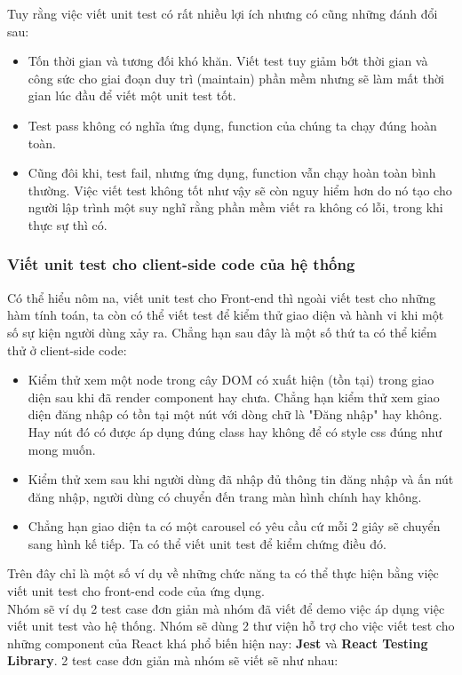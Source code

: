 			 	Tuy rằng việc viết unit test có rất nhiều lợi ích nhưng có cũng những đánh đổi sau:
			 	\begin{itemize}
			 		\item Tốn thời gian và tương đối khó khăn. Viết test tuy giảm bớt thời gian và công sức cho giai đoạn duy trì (maintain) phần mềm nhưng sẽ làm mất thời gian lúc đầu để viết một unit test tốt.
			 		\item Test pass không có nghĩa ứng dụng, function của chúng ta chạy đúng hoàn toàn.
			 		\item Cũng đôi khi, test fail, nhưng ứng dụng, function vẫn chạy hoàn toàn bình thường. Việc viết test không tốt như vậy sẽ còn nguy hiểm hơn do nó tạo cho người lập trình một suy nghĩ rằng phần mềm viết ra không có lỗi, trong khi thực sự thì có.
			 	\end{itemize}
			 	
			 	\subsubsection{Viết unit test cho client-side code của hệ thống}
			 	Có thể hiểu nôm na, viết unit test cho Front-end thì ngoài viết test cho những hàm tính toán, ta còn có thể viết test để kiểm thử giao diện và hành vi khi một số sự kiện người dùng xảy ra. Chẳng hạn sau đây là một số thứ ta có thể kiểm thử ở client-side code:
			 	
			 	\begin{itemize}
			 		\item Kiểm thử xem một node trong cây DOM có xuất hiện (tồn tại) trong giao diện sau khi đã render component hay chưa. Chẳng hạn kiểm thử xem giao diện đăng nhập có tồn tại một nút với dòng chữ là "Đăng nhập" hay không. Hay nút đó có được áp dụng đúng class hay không để có style css đúng như mong muốn.
			 		\item Kiểm thử xem sau khi người dùng đã nhập đủ thông tin đăng nhập và ấn nút đăng nhập, người dùng có chuyển đến trang màn hình chính hay không.
			 		\item Chẳng hạn giao diện ta có một carousel có yêu cầu cứ mỗi 2 giây sẽ chuyển sang hình kế tiếp. Ta có thể viết unit test để kiểm chứng điều đó.
			 	\end{itemize}
			 	
			 	Trên đây chỉ là một số ví dụ về những chức năng ta có thể thực hiện bằng việc viết unit test cho front-end code của ứng dụng.\\
			 	
			 	Nhóm sẽ ví dụ 2 test case đơn giản mà nhóm đã viết để demo việc áp dụng việc viết unit test vào hệ thống. Nhóm sẽ dùng 2 thư viện hỗ trợ cho việc viết test cho những component của React khá phổ biến hiện nay: \textbf{Jest} và \textbf{React Testing Library}. 2 test case đơn giản mà nhóm sẽ viết sẽ như nhau:
			 	
